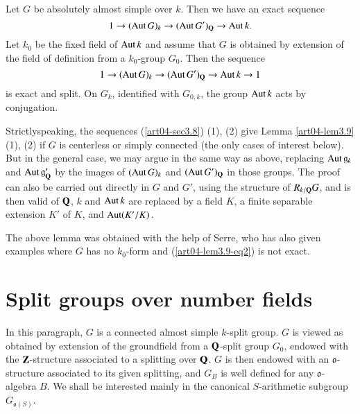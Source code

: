 \setcounter{theorem}{8}
\begin{lemma}\label{art04-lem3.9}
Let $G$ be absolutely almost simple over $k$. Then we have an exact sequence
\setcounter{equation}{0}
\begin{equation}
1\to (\operatorname{\mathrm{Aut}} G)_{k}\to (\operatorname{\mathrm{Aut}} G')_{\mathbf{Q}}\to \operatorname{\mathrm{Aut}} k.\label{art04-lem3.9-eq1}
\end{equation}
Let $k_{0}$ be the fixed field of $\operatorname{\mathrm{Aut}} k$ and assume that $G$ is obtained by extension of the field of definition from a $k_{0}$-group $G_{0}$. Then the sequence
\begin{equation}
1\to (\operatorname{\mathrm{Aut}} G)_{k}\to (\operatorname{\mathrm{Aut}} G')_{\mathbf{Q}}\to \operatorname{\mathrm{Aut}} k\to 1\label{art04-lem3.9-eq2}
\end{equation}
is exact and split. On $G_{k}$, identified with $G_{0,k}$, the group $\operatorname{\mathrm{Aut}} k$ acts by conjugation.
\end{lemma}

Strictly\pageoriginale speaking, the sequences (\ref{art04-sec3.8}) (1), (2) give Lemma \ref{art04-lem3.9} (1), (2) if $G$ is centerless or simply connected (the only cases of interest below). But in the general case, we may argue in the same way as above, replacing $\operatorname{\mathrm{Aut}} \mathfrak{g}_{k}$ and $\operatorname{\mathrm{Aut}} \mathfrak{g}'_{\mathbf{Q}}$ by the images of $(\operatorname{\mathrm{Aut}} G)_{k}$ and $(\operatorname{\mathrm{Aut}} G')_{\mathbf{Q}}$ in those groups. The proof can also be carried out directly in $G$ and $G'$, using the structure of $R_{k/\mathbf{Q}}G$, and is then valid of $\mathbf{Q}$, $k$ and $\operatorname{\mathrm{Aut}} k$ are replaced by a field $K$, a finite separable extension $K'$ of $K$, and $\operatorname{\mathrm{Aut}} (K'/K)$.

\begin{remark*}
The above lemma was obtained with the help of Serre, who has also given examples where $G$ has no $k_{0}$-form and (\ref{art04-lem3.9-eq2}) is not exact.
\end{remark*}

\section{Split groups over number fields}\label{art04-sec4}

In this paragraph, $G$ is a connected almost simple $k$-split group. $G$ is viewed as obtained by extension of the groundfield from a $\mathbf{Q}$-split group $G_{0}$, endowed with the $\mathbf{Z}$-structure associated to a splitting over $\mathbf{Q}$. $G$ is then endowed with an $\mathfrak{o}$-structure associated to its given splitting, and $G_{B}$ is well defined for any $\mathfrak{o}$-algebra $B$. We shall be interested mainly in the canonical $S$-arithmetic subgroup $G_{\mathfrak{o}(S)}$.

